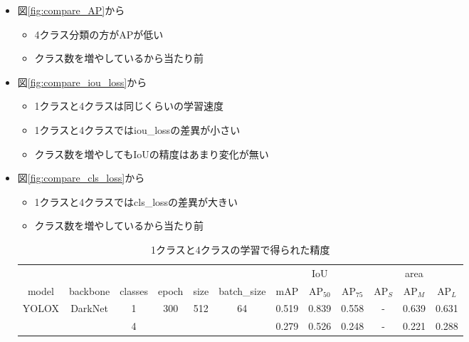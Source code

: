 \documentclass[a4j]{ujarticle}
\newcommand{\Fref}[1]{\mbox{図\ref{fig:#1}}}
\begin{document}
\begin{itemize}
            \begin{itemize}
                \item \Fref{compare_AP}から
                \begin{itemize}
                    \item 4クラス分類の方がAPが低い
                    \item クラス数を増やしているから当たり前
                \end{itemize}
                \item \Fref{compare_iou_loss}から
                \begin{itemize}
                    \item 1クラスと4クラスは同じくらいの学習速度
                    \item 1クラスと4クラスではiou\_lossの差異が小さい
                    \item クラス数を増やしてもIoUの精度はあまり変化が無い
                \end{itemize}
                \item \Fref{compare_cls_loss}から
                \begin{itemize}
                    \item 1クラスと4クラスではcls\_lossの差異が大きい
                    \item クラス数を増やしているから当たり前
                \end{itemize}

                \begin{table}[h]
                    \centering
                    \caption{1クラスと4クラスの学習で得られた精度}
                    \label{tab:compare}
                    \begin{tabular}{cccccc|ccc|ccc}
                        & & & & & & & IoU & & & area & \\
                        model & backbone & classes & epoch & size & batch\_size & mAP & AP$_{50}$ & AP$_{75}$ & AP$_S$ & AP$_M$ & AP$_L$ \\ \hline
                        \multirow{2}{*}{YOLOX\cite{yolox}} & \multirow{2}{*}{DarkNet} & 1 & \multirow{2}{*}{300} & \multirow{2}{*}{512} & \multirow{2}{*}{64} & 0.519 & 0.839 & 0.558 & - & 0.639 & 0.631 \\
                        &  & 4 &  &  &  & 0.279 & 0.526 & 0.248 & - & 0.221 & 0.288 \\
                    \end{tabular}
                \end{table}


\end{itemize}
\end{itemize}
\end{document}
